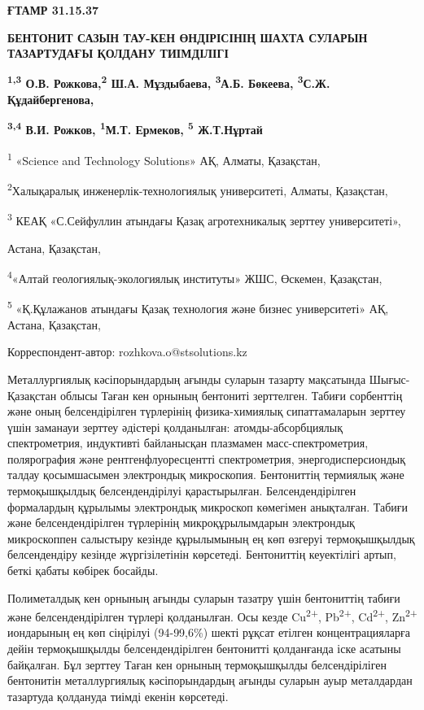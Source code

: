 \newpage
{\bfseries ҒТАМР 31.15.37}

{\bfseries БЕНТОНИТ САЗЫН ТАУ-КЕН ӨНДІРІСІНІҢ ШАХТА СУЛАРЫН ТАЗАРТУДАҒЫ
ҚОЛДАНУ ТИІМДІЛІГІ}

{\bfseries \textsuperscript{1,3} О.В. Рожкова,\textsuperscript{2} Ш.А.
Мұздыбаева, \textsuperscript{3}А.Б. Бөкеева, \textsuperscript{3}С.Ж.
Құдайбергенова,}

{\bfseries \textsuperscript{3,4} В.И. Рожков, \textsuperscript{1}М.Т.
Ермеков, \textsuperscript{5} Ж.Т.Нұртай}

\textsuperscript{1} «Science and Technology Solutions» АҚ, Алматы,
Қазақстан,

\textsuperscript{2}Халықаралық инженерлік-технологиялық университеті,
Алматы, Қазақстан,

\textsuperscript{3} КЕАҚ «С.Сейфуллин атындағы Қазақ агротехникалық
зерттеу университеті»,

Астана, Қазақстан,

\textsuperscript{4}«Алтай геологиялық-экологиялық институты» ЖШС,
Өскемен, Қазақстан,

\textsuperscript{5} «Қ.Құлажанов атындағы Қазақ технология және бизнес
университеті» АҚ, Астана, Қазақстан,

Корреспондент-автор: rozhkova.o@stsolutions.kz

Металлургиялық кәсіпорындардың ағынды суларын тазарту мақсатында
Шығыс-Қазақстан облысы Таған кен орнының бентониті зерттелген. Табиғи
сорбенттің және оның белсендірілген түрлерінің физика-химиялық
сипаттамаларын зерттеу үшін заманауи зерттеу әдістері қолданылған:
атомды-абсорбциялық спектрометрия, индуктивті байланысқан плазмамен
масс-спектрометрия, полярография және рентгенфлуоресцентті
спектрометрия, энергодисперсиондық талдау қосымшасымен электрондық
микроскопия. Бентониттің термиялық және термоқышқылдық белсендендірілуі
қарастырылған. Белсендендірілген формалардың құрылымы электрондық
микроскоп көмегімен анықталған. Табиғи және белсендендірілген түрлерінің
микроқұрылымдарын электрондық микроскоппен салыстыру кезінде құрылымының
ең көп өзгеруі термоқышқылдық белсендендіру кезінде жүргізілетінін
көрсетеді. Бентониттің кеуектілігі артып, беткі қабаты көбірек босайды.

Полиметалдық кен орнының ағынды суларын тазатру үшін бентониттің табиғи
және белсендендірілген түрлері қолданылған. Осы кезде
Cu\textsuperscript{2+}, Pb\textsuperscript{2+}, Cd\textsuperscript{2+},
Zn\textsuperscript{2+} иондарының ең көп сіңірілуі (94-99,6\%) шекті
рұқсат етілген концентрацияларға дейін термоқышқылды белсендендірілген
бентонитті қолданғанда іске асатыны байқалған. Бұл зерттеу Таған кен
орнының термоқышқылды белсендіріліген бентонитін металлургиялық
кәсіпорындардың ағынды суларын ауыр металдардан тазартуда қолдануда
тиімді екенін көрсетеді.


